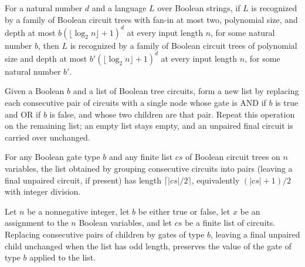 \begin{theorem}
\label{Language.InTreeNC.inTreeAC}
\leanok
{}
For a natural number $d$ and a language $L$ over Boolean strings, if $L$ is recognized
by a family of Boolean circuit trees with fan-in at most two, polynomial size, and depth
at most $b(\lfloor\log_2 n\rfloor+1)^d$ at every input length $n$, for some natural
number $b$, then $L$ is recognized by a family of Boolean circuit trees of polynomial
size and depth at most $b'(\lfloor\log_2 n\rfloor+1)^d$ at every input length $n$, for
some natural number $b'$.
\end{theorem}

\begin{definition}
\label{BoolCircuit.pairUp}
\leanok
{}
Given a Boolean $b$ and a list of Boolean tree circuits, form a new list by replacing
each consecutive pair of circuits with a single node whose gate is AND if $b$ is true
and OR if $b$ is false, and whose two children are that pair. Repeat this operation on
the remaining list; an empty list stays empty, and an unpaired final circuit is carried
over unchanged.
\end{definition}

\begin{theorem}
\label{BoolCircuit.length_pairUp}
\leanok
{}
For any Boolean gate type $b$ and any finite list $cs$ of Boolean circuit trees on $n$
variables, the list obtained by grouping consecutive circuits into pairs (leaving a
final unpaired circuit, if present) has length $\lceil |cs|/2\rceil$, equivalently
$(|cs|+1)/2$ with integer division.
\end{theorem}

\begin{theorem}
\label{BoolCircuit.eval_node_pairUp}
\leanok
{}
Let $n$ be a nonnegative integer, let $b$ be either true or false, let $x$ be an
assignment to the $n$ Boolean variables, and let $cs$ be a finite list of circuits.
Replacing consecutive pairs of children by gates of type $b$, leaving a final unpaired
child unchanged when the list has odd length, preserves the value of the gate of type
$b$ applied to the list.
\end{theorem}

